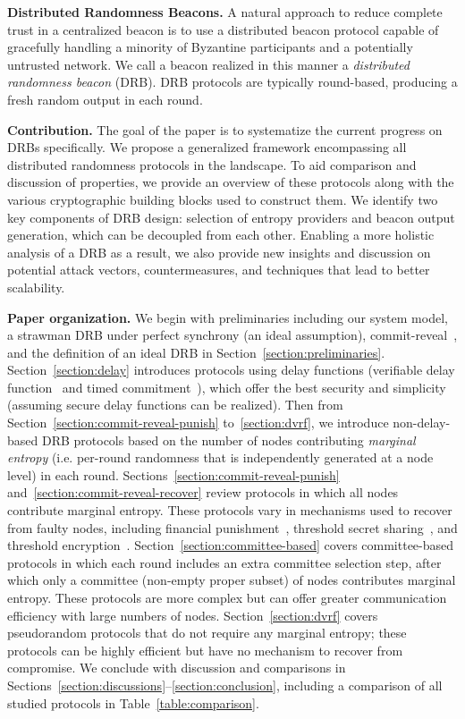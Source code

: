 \textbf{Distributed Randomness Beacons.}
A natural approach to reduce complete trust in a centralized beacon is to use a distributed beacon protocol capable of gracefully handling a minority of Byzantine participants and a potentially untrusted network. We call a beacon realized in this manner a \textit{distributed randomness beacon} (DRB). DRB protocols are typically round-based, producing a fresh random output in each round.

\textbf{Contribution.} The goal of the paper is to systematize the current progress on DRBs specifically. We propose a generalized framework encompassing all distributed randomness protocols in the landscape. To aid comparison and discussion of properties, we provide an overview of these protocols along with the various cryptographic building blocks used to construct them. We identify two key components of DRB design: selection of entropy providers and beacon output generation, which can be decoupled from each other. Enabling a more holistic analysis of a DRB as a result, we also provide new insights and discussion on potential attack vectors, countermeasures, and techniques that lead to better scalability.

\textbf{Paper organization.} We begin with preliminaries including our system model, a strawman DRB under perfect synchrony (an ideal assumption), commit-reveal~\cite{blum1983coin}, and the definition of an ideal DRB in Section~\ref{section:preliminaries}. Section~\ref{section:delay} introduces protocols using delay functions (verifiable delay function~\cite{boneh2018verifiable} and timed commitment~\cite{boneh2000timed}), which offer the best security and simplicity (assuming secure delay functions can be realized). Then from Section~\ref{section:commit-reveal-punish} to~\ref{section:dvrf}, we introduce non-delay-based DRB protocols based on the number of nodes contributing \textit{marginal entropy} (i.e. per-round randomness that is independently generated at a node level) in each round. Sections~\ref{section:commit-reveal-punish} and~\ref{section:commit-reveal-recover} review protocols in which all nodes contribute marginal entropy. These protocols vary in mechanisms used to recover from faulty nodes, including financial punishment~\cite{youcai2017randao, david2020economically}, threshold secret sharing~\cite{schoenmakers1999simple, cascudo2017scrape}, and threshold encryption~\cite{desmedt1990Threshold}. Section~\ref{section:committee-based} covers committee-based protocols in which each round includes an extra committee selection step, after which only a committee (non-empty proper subset) of nodes contributes marginal entropy. These protocols are more complex but can offer greater communication efficiency with large numbers of nodes. Section~\ref{section:dvrf} covers pseudorandom protocols that do not require any marginal entropy; these protocols can be highly efficient but have no mechanism to recover from compromise. We conclude with discussion and comparisons in Sections~\ref{section:discussions}--\ref{section:conclusion}, including a comparison of all studied protocols in Table~\ref{table:comparison}.

